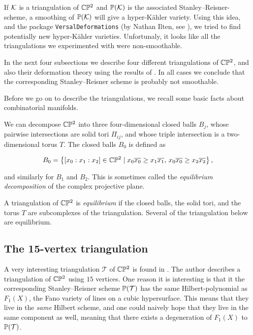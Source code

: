 If $\K$ is a triangulation of $\C \P^2$ and $\P(\K)$ is the associated Stanley--Reisner-scheme, a smoothing of $\P(\K)$ will give a hyper-Kähler variety. Using this idea, and the \MM package \texttt{VersalDeformations} (by Nathan Ilten, see \cite{ilten_versaldeformations}), we tried to find potentially new hyper-Kähler varieties. Unfortunaly, it looks like all the triangulations we experimented with were non-smoothable.

In the next four subsections we describe four different triangulations of $\C \P^2$, and also their deformation theory using the results of \cite{deforming_christophersen}. In all cases we conclude that the corresponding Stanley--Reisner scheme is probably not smoothable.

Before we go on to describe the triangulations, we recall some basic facts about combinatorial manifolds.

We can decompose $\C \P^2$ into three four-dimensional closed balls $B_j$, whose pairwise intersections are solid tori $\Pi_{ij}$, and whose triple intersection is a two-dimensional torus $T$. The closed balls $B_0$ is defined as 

$$
B_0 = \left\{ [x_0:x_1:x_2] \in \C \P ^2 \mid x_0\overline{x_0} \geq x_1 \overline{x_1}, \,  x_0\overline{x_0} \geq x_2\overline{x_2} \right\},
$$

and similarly for $B_1$ and $B_2$. This is sometimes called the \emph{equilibrium decomposition} of the complex projective plane.

A triangulation of $\C \P^2$ is \emph{equilibrium} if the closed balls, the solid tori, and the torus $T$ are subcomplexes of the triangulation. Several of the triangulation below are equilibrium.

\subsection{The 15-vertex triangulation}

A very interesting triangulation $\mathcal T$ of $\C\P^2$ is found in \cite{cp2_15_chess}. The author describes a triangulation of $\C \P^2$ using $15$ vertices. One reason it is interesting is that it the corresponding Stanley--Reisner scheme $\P(\mathcal T)$ has the same Hilbert-polynomial as $F_1(X)$, the Fano variety of lines on a cubic hypersurface. This means that they live in the \emph{same} Hilbert scheme, and one could naively hope that they live in the same component as well, meaning that there exists a degeneration of $F_1(X)$ to $\P(\mathcal T)$.


